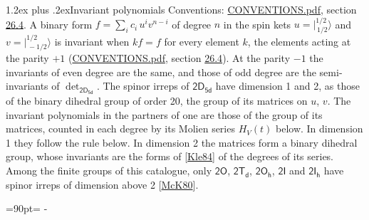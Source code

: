 \documentclass[10pt,a4paper]{article}
\makeatletter
\renewcommand\section{\@startsection{section}{1}{\z@}{-3ex plus -1ex minus -.2ex}%
  {1.2ex plus .2ex}{\normalfont\large\sffamily\bfseries\color{parttitle}}}
\newcommand{\needspace}[1]{\par\penalty-100\begingroup\dimen0=#1\relax\dimen2=\pagegoal
  \advance\dimen2-\pagetotal\ifdim\dimen0>\dimen2\relax\ifdim\dimen2>0pt\vfil\break\fi\fi
  \endgroup}
\numberwithin{equation}{section}
\newcommand{\grp}[1]{\mathsf{#1}}
\newcommand{\jm}[2]{\bigl\lvert{}^{#1}_{\,#2}\bigr\rangle}
\makeatother
\begin{document}
\section{Invariant polynomials}\label{s:invariants}
Conventions: \href{../../CONVENTIONS.pdf}{CONVENTIONS.pdf}, section \href{../../CONVENTIONS.pdf\#conv.26.4}{26.4}.
\leavevmode\label{n:local.binary.form}A binary form $f = \sum_i c_i\, u^i v^{n-i}$ of degree $n$ in the spin kets $u = \jm{1/2}{1/2}$ and $v = \jm{1/2}{-1/2}$ is invariant when $k f = f$ for every element $k$, the elements acting at the parity $+1$ (\href{../../CONVENTIONS.pdf}{CONVENTIONS.pdf}, section \href{../../CONVENTIONS.pdf\#conv.26.4}{26.4}). At the parity $-1$ the invariants of even degree are the same, and those of odd degree are the semi-invariants of $\det_{\grp{2D_{5d}}}$.
The spinor irreps of $\grp{2D_{5d}}$ have dimension 1 and 2, as those of the binary dihedral group of order 20, the group of its matrices on $u$, $v$. \label{n:function.hilbert}The invariant polynomials in the partners of one are those of the group of its matrices, counted in each degree by its Molien series $H_V(t)$ below. In dimension 1 they follow the rule below. In dimension 2 the matrices form a binary dihedral group, whose invariants are the forms of [\href{../../../REFERENCES.pdf\#ref.Kle84}{Kle84}] of the degrees of its series. Among the finite groups of this catalogue, only $\grp{2O}$, $\grp{2T_{d}}$, $\grp{2O_{h}}$, $\grp{2I}$ and $\grp{2I_{h}}$ have spinor irreps of dimension above 2 [\href{../../../REFERENCES.pdf\#ref.McK80}{McK80}].
\needspace{90pt}
\end{document}
